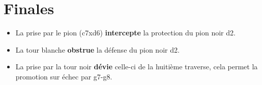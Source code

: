 \section{Finales}

\begin{minipage}{0.45\textwidth}
\newgame
{}


\begin{itemize}[leftmargin=1cm, label=, itemsep=1pt]
\item \hspace{0.7cm}La prise par le pion (c7xd6) {\bf intercepte} la protection du pion noir d2.
\item \hspace{0.7cm}La tour blanche {\bf obstrue} la défense du pion noir d2.
\item \hspace{0.7cm}La prise par la tour noir {\bf dévie} celle-ci de la huitième traverse, cela permet la promotion sur échec par g7-g8.
\end{itemize}

\vspace{0.5cm}
\hspace{0.7cm}
\end{minipage}
\hfill
\begin{minipage}{0.45\textwidth}
\chessboard[
inverse,markstyle=leftborder,
]%
\end{minipage}


